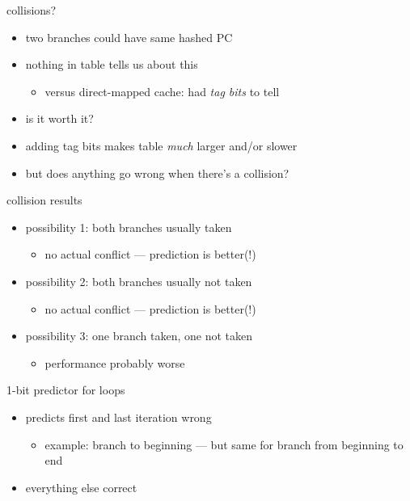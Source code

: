 \begin{frame}{collisions?}
\begin{itemize}
\item two branches could have same hashed PC
\item nothing in table tells us about this
    \begin{itemize}
    \item versus direct-mapped cache: had \textit{tag bits} to tell
    \end{itemize}
\vspace{.5cm}
\item is it worth it?
\item adding tag bits makes table \textit{much} larger and/or slower
\item but does anything go wrong when there's a collision?
\end{itemize}
\end{frame}

\begin{frame}{collision results}
\begin{itemize}
\item possibility 1: both branches usually taken
    \begin{itemize}
    \item no actual conflict --- prediction is better(!)
    \end{itemize}
\item possibility 2: both branches usually not taken
    \begin{itemize}
    \item no actual conflict --- prediction is better(!)
    \end{itemize}
\item possibility 3: one  branch taken, one not taken
    \begin{itemize}
    \item performance probably worse
    \end{itemize}
\end{itemize}
\end{frame}

\begin{frame}{1-bit predictor for loops}
\begin{itemize}
\item predicts first and last iteration wrong
    \begin{itemize}
    \item example: branch to beginning --- but same for branch from beginning to end
    \end{itemize}
\item everything else correct
\end{itemize}
\end{frame}

